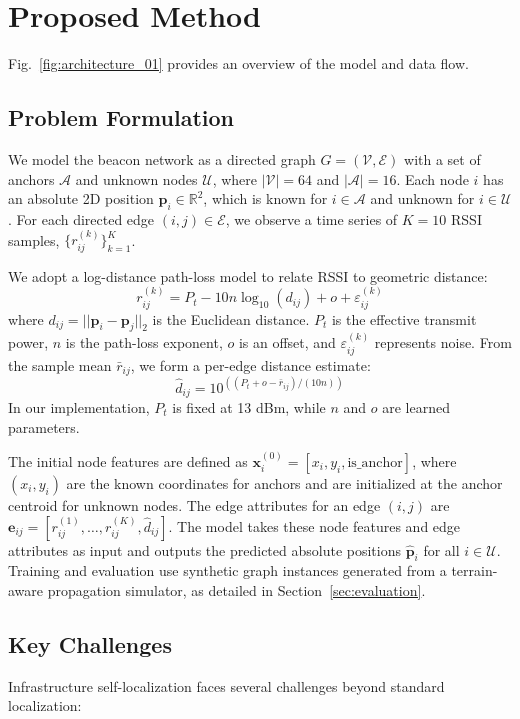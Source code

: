 \documentclass{ieeeaccess}
\begin{document}
\section{Proposed Method}
Fig.~\ref{fig:architecture_01} provides an overview of the model and data flow.

\subsection{Problem Formulation}
We model the beacon network as a directed graph $G=(\mathcal{V}, \mathcal{E})$ with a set of anchors $\mathcal{A}$ and unknown nodes $\mathcal{U}$, where $|\mathcal{V}|=64$ and $|\mathcal{A}|=16$. Each node $i$ has an absolute 2D position $\mathbf{p}_i \in \mathbb{R}^2$, which is known for $i \in \mathcal{A}$ and unknown for $i \in \mathcal{U}$. For each directed edge $(i, j) \in \mathcal{E}$, we observe a time series of $K=10$ RSSI samples, $\{r_{ij}^{(k)}\}_{k=1}^K$.

We adopt a log-distance path-loss model to relate RSSI to geometric distance:
\begin{equation}
r_{ij}^{(k)} = P_t - 10 n \log_{10}(d_{ij}) + o + \varepsilon_{ij}^{(k)}
\label{eq:pathloss_model}
\end{equation}
where $d_{ij} = ||\mathbf{p}_i - \mathbf{p}_j||_2$ is the Euclidean distance. $P_t$ is the effective transmit power, $n$ is the path-loss exponent, $o$ is an offset, and $\varepsilon_{ij}^{(k)}$ represents noise. From the sample mean $\bar{r}_{ij}$, we form a per-edge distance estimate:
\begin{equation}
\hat{d}_{ij} = 10^{((P_t + o - \bar{r}_{ij})/(10 n))}
\label{eq:rssi_to_dist}
\end{equation}
In our implementation, $P_t$ is fixed at 13 dBm, while $n$ and $o$ are learned parameters.

The initial node features are defined as $\mathbf{x}_i^{(0)} = [x_i, y_i, \text{is\_anchor}]$, where $(x_i, y_i)$ are the known coordinates for anchors and are initialized at the anchor centroid for unknown nodes. The edge attributes for an edge $(i,j)$ are $\mathbf{e}_{ij} = [r_{ij}^{(1)}, \dots, r_{ij}^{(K)}, \hat{d}_{ij}]$. The model takes these node features and edge attributes as input and outputs the predicted absolute positions $\hat{\mathbf{p}}_i$ for all $i \in \mathcal{U}$. Training and evaluation use synthetic graph instances generated from a terrain-aware propagation simulator, as detailed in Section~\ref{sec:evaluation}.

\subsection{Key Challenges}
Infrastructure self-localization faces several challenges beyond standard localization:
\end{document}
